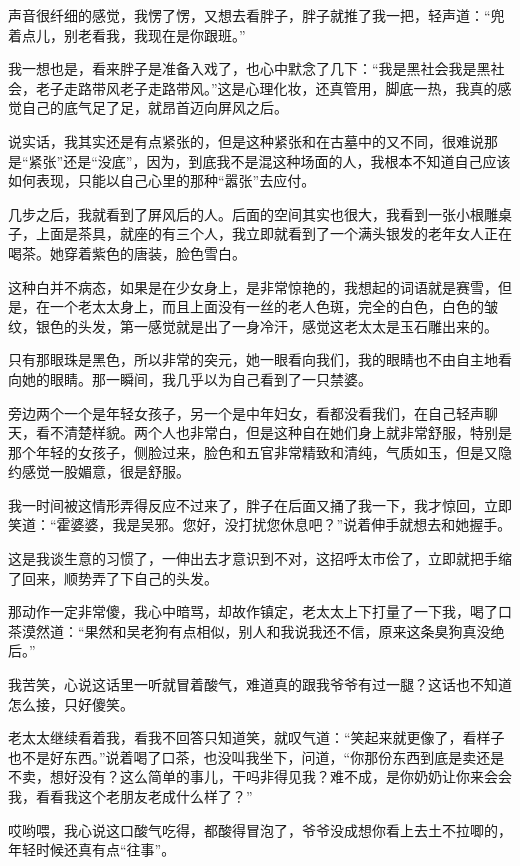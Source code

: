 声音很纤细的感觉，我愣了愣，又想去看胖子，胖子就推了我一把，轻声道：“兜着点儿，别老看我，我现在是你跟班。”

我一想也是，看来胖子是准备入戏了，也心中默念了几下：“我是黑社会我是黑社会，老子走路带风老子走路带风。”这是心理化妆，还真管用，脚底一热，我真的感觉自己的底气足了足，就昂首迈向屏风之后。

说实话，我其实还是有点紧张的，但是这种紧张和在古墓中的又不同，很难说那是“紧张”还是“没底”，因为，到底我不是混这种场面的人，我根本不知道自己应该如何表现，只能以自己心里的那种“嚣张”去应付。

几步之后，我就看到了屏风后的人。后面的空间其实也很大，我看到一张小根雕桌子，上面是茶具，就座的有三个人，我立即就看到了一个满头银发的老年女人正在喝茶。她穿着紫色的唐装，脸色雪白。

这种白并不病态，如果是在少女身上，是非常惊艳的，我想起的词语就是赛雪，但是，在一个老太太身上，而且上面没有一丝的老人色斑，完全的白色，白色的皱纹，银色的头发，第一感觉就是出了一身冷汗，感觉这老太太是玉石雕出来的。

只有那眼珠是黑色，所以非常的突元，她一眼看向我们，我的眼睛也不由自主地看向她的眼睛。那一瞬间，我几乎以为自己看到了一只禁婆。

旁边两个一个是年轻女孩子，另一个是中年妇女，看都没看我们，在自己轻声聊天，看不清楚样貌。两个人也非常白，但是这种自在她们身上就非常舒服，特别是那个年轻的女孩子，侧脸过来，脸色和五官非常精致和清纯，气质如玉，但是又隐约感觉一股媚意，很是舒服。

我一时间被这情形弄得反应不过来了，胖子在后面又捅了我一下，我才惊回，立即笑道：“霍婆婆，我是吴邪。您好，没打扰您休息吧？”说着伸手就想去和她握手。

这是我谈生意的习惯了，一伸出去才意识到不对，这招呼太市侩了，立即就把手缩了回来，顺势弄了下自己的头发。

那动作一定非常傻，我心中暗骂，却故作镇定，老太太上下打量了一下我，喝了口茶漠然道：“果然和吴老狗有点相似，别人和我说我还不信，原来这条臭狗真没绝后。”

我苦笑，心说这话里一听就冒着酸气，难道真的跟我爷爷有过一腿？这话也不知道怎么接，只好傻笑。

老太太继续看着我，看我不回答只知道笑，就叹气道：“笑起来就更像了，看样子也不是好东西。”说着喝了口茶，也没叫我坐下，问道，“你那份东西到底是卖还是不卖，想好没有？这么简单的事儿，干吗非得见我？难不成，是你奶奶让你来会会我，看看我这个老朋友老成什么样了？”

哎哟喂，我心说这口酸气吃得，都酸得冒泡了，爷爷没成想你看上去土不拉唧的，年轻时候还真有点“往事”。

